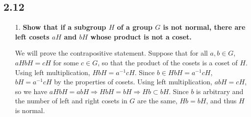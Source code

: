 \documentclass[a4paper,12pt]{article}
\begin{document}
\subsection*{2.12}
\begin{enumerate}
    \item[1.]
        \boldmath
        \textbf{Show that if a subgroup $H$ of a group $G$ is not normal, there are left cosets $aH$ and $bH$ whose product is not a coset.} \par
        \unboldmath
        We will prove the contrapositive statement. Suppose that for all $a, b \in G$, $aHbH = cH$ for some $c \in G$, so that the product of the cosets is a coset of $H$. Using left multiplication, $HbH = a^{-1} cH$. Since $b \in HbH = a^{-1} cH$, $bH = a^{-1} cH$ by the properties of cosets. Using left multiplication, $abH = cH$, so we have $aHbH = abH \Rightarrow HbH = bH \Rightarrow Hb \subset bH$. Since $b$ is arbitrary and the number of left and right cosets in $G$ are the same, $Hb = bH$, and thus $H$ is normal.


\end{enumerate}
\end{document}
